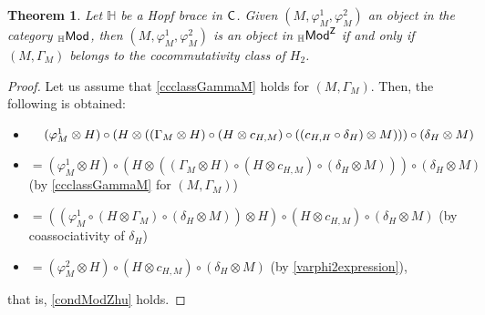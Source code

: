 \documentclass[11pt,reqno]{amsart}
\theoremstyle{plain}%
\newtheorem{theorem}{Theorem}[section]%
\theoremstyle{definition}
\theoremstyle{remark}
\begin{document}
\begin{theorem}\label{firstM}
	Let ${\mathbb H}$ be a Hopf brace in ${\sf C}$. Given $(M,\varphi_{M}^{1},\varphi_{M}^{2})$ an object in the category ${}_{\mathbb{H}}{\sf Mod}$, then  $(M,\varphi_{M}^{1},\varphi_{M}^{2})$ is an object in ${}_{\mathbb{H}}{\sf Mod}^{{\sf Z}}$ if and only if $(M,\Gamma_{M})$ belongs to the cocommutativity class of $H_{2}$.
\end{theorem}
\begin{proof}
	Let us assume that \eqref{ccclassGammaM} holds for $(M,\Gamma_{M})$. Then, the following is obtained:
	\begin{itemize}
		\itemindent=-32pt 
		\item[]$\hspace{0.38cm}(\varphi_{M}^{1}\otimes H)\circ(H\otimes((\Gamma_{M}\otimes H)\circ (H\otimes c_{H,M})\circ ((c_{H,H}\circ\delta_{H})\otimes M)))\circ(\delta_{H}\otimes M)$
		\item[]$=(\varphi_{M}^{1}\otimes H)\circ(H\otimes((\Gamma_{M}\otimes H)\circ(H\otimes c_{H,M})\circ(\delta_{H}\otimes M)))\circ(\delta_{H}\otimes M)$ {\footnotesize (by \eqref{ccclassGammaM} for $(M,\Gamma_{M})$)}
		\item[]$=((\varphi_{M}^{1}\circ(H\otimes \Gamma_{M})\circ(\delta_{H}\otimes M))\otimes H)\circ(H\otimes c_{H,M})\circ(\delta_{H}\otimes M)$ {\footnotesize (by coassociativity of $\delta_{H}$)}
		\item[]$=(\varphi_{M}^{2}\otimes H)\circ (H\otimes c_{H,M})\circ(\delta_{H}\otimes M)$ {\footnotesize (by \eqref{varphi2expression})},
	\end{itemize}
	that is, \eqref{condModZhu} holds.
	

\end{proof}
\end{document}
